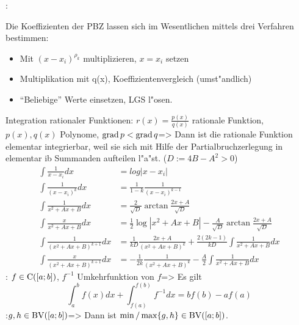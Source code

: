 \remark:{
  Die Koeffizienten der PBZ lassen sich im Wesentlichen mittels drei
  Verfahren bestimmen:
  \begin{itemize}
    \item Mit $(x-x_i)^{\rho_k}$ multiplizieren, $x=x_i$ setzen
    \item Multiplikation mit q(x), Koeffizientenvergleich (umst"andlich)
    \item ``Beliebige'' Werte einsetzen, LGS l"osen.
    \end{itemize}
  }
\theorem Integration rationaler Funktionen:
  $r(x)=\frac {p(x)}{q(x)}$ rationale Funktion, $p(x),q(x)$ Polynome,
  $\operatorname{grad} p <\operatorname{grad} q$=>{
  Dann ist die rationale Funktion elementar integrierbar, weil sie
  sich mit Hilfe der Partialbruchzerlegung in elementar ib Summanden
  aufteilen l"a"st. ($D:=4B-A^2>0$)
  \begin{align*}      
    \int \frac 1 {x-x_i} dx &= log |x-x_i|\\
    \int \frac 1 {(x-x_i)^k} dx &= \frac 1 {1-k} \frac 1 {(x-x_i)^{k-1}}\\
    \int \frac 1 {x^2+Ax+B} dx &=
      \frac 2 {\sqrt D} \arctan \frac {2x+A} {\sqrt D}\\
    \int \frac x {x^2+Ax+B} dx &=
      \frac 1 2 \log |x^2+Ax+B|-
      \frac A {\sqrt D} \arctan \frac {2x+A} {\sqrt D}\\
    \int \frac 1 {(x^2+Ax+B)^{k+1}} dx &=
      \frac 1 {kD} \frac {2x+A} {(x^2+Ax+B)^k} 
      + \frac {2(2k-1)} {kD} \int \frac 1 {x^2+Ax+B} dx\\
    \int \frac x {(x^2+Ax+B)^{k+1}} dx &=
      -\frac 1 {2k} \frac 1 {(x^2+Ax+B)^k} 
      -\frac A 2 \int \frac 1 {x^2+Ax+B} dx
    \end{align*}
  }
\theorem: $f\in{\rm C}([a;b])$, $f^{-1}$ Umkehrfunktion von $f$=>{
  Es gilt
  \[\int_a^b f(x)dx+\int_{f(a)}^{f(b)} f^{-1} dx = bf(b)-af(a)
    \]
  }
\theorem:$g,h\in{\rm BV}([a;b])$=>{
  Dann ist $\min/\max\{g,h\}\in{\rm BV}([a;b])$.
  }
